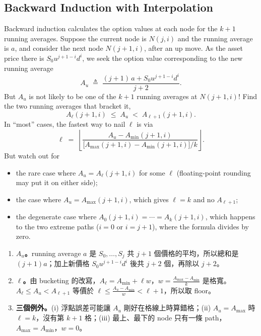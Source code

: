 \subsection{Backward Induction with Interpolation}


Backward induction calculates the option values at each node for the $k+1$ running averages.
Suppose the current node is $N(j,i)$ and the running average is $a$, and consider the next node $N(j+1,i)$, after an up move.
As the asset price there is $S_{0}u^{j+1-i}d^{i}$, we seek the option value corresponding to the new running average
\[
	A_{u} \;\triangleq\; \frac{(j+1)\,a+S_{0}u^{j+1-i}d^{i}}{j+2} .
\]
But $A_{u}$ is not likely to be one of the $k+1$ running averages at $N(j+1,i)$!
Find the two running averages that bracket it,
\[
	A_{\ell}(j+1,i) \;\le\; A_{u} \;<\; A_{\ell+1}(j+1,i) .
\]
In ``most'' cases, the fastest way to nail $\ell$ is via
\[
	\ell \;=\; \left\lfloor\frac{A_{u}-A_{\min}(j+1,i)}{\bigl[A_{\max}(j+1,i)-A_{\min}(j+1,i)\bigr]/k}\right\rfloor .
\]
But watch out for
\begin{itemize}[nosep]
	\item the rare case where $A_{u}=A_{\ell}(j+1,i)$ for some $\ell$ (floating-point rounding may put it on either side);
	\item the case where $A_{u}=A_{\max}(j+1,i)$, which gives $\ell=k$ and no $A_{\ell+1}$;
	\item the degenerate case where $A_{0}(j+1,i)=\cdots=A_{k}(j+1,i)$, which happens to the two extreme paths ($i=0$ or $i=j+1$), where the formula divides by zero.
\end{itemize}

\suppstart
{}

\begin{remark}
	\begin{enumerate}[(1),nosep]
		\item \textbf{$A_{u}$。}running average $a$ 是 $S_{0},\ldots,S_{j}$ 共 $j+1$ 個價格的平均，所以總和是 $(j+1)a$；加上新價格 $S_{0}u^{j+1-i}d^{i}$ 後共 $j+2$ 個，再除以 $j+2$。
		\item \textbf{$\ell$。}由 bucketing 的改寫，$A_{\ell}=A_{\min}+\ell w$，$w=\frac{A_{\max}-A_{\min}}{k}$ 是格寬。$A_{\ell}\le A_{u}<A_{\ell+1}$ 等價於 $\ell\le\frac{A_{u}-A_{\min}}{w}<\ell+1$，所以取 floor。
		\item \textbf{三個例外。}(i) 浮點誤差可能讓 $A_{u}$ 剛好在格線上時算錯格；(ii) $A_{u}=A_{\max}$ 時 $\ell=k$，沒有第 $k+1$ 格；(iii) 最上、最下的 node 只有一條 path，$A_{\max}=A_{\min}$，$w=0$。
	\end{enumerate}
\end{remark}
\suppend

